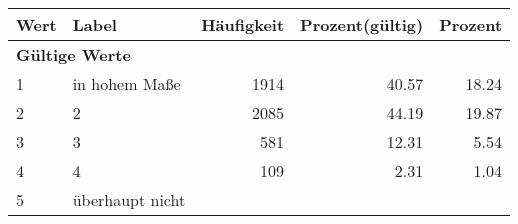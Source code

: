      \begin{longtable}{lXrrr}
     \toprule
     \textbf{Wert} & \textbf{Label} & \textbf{Häufigkeit} & \textbf{Prozent(gültig)} & \textbf{Prozent} \\
     \endhead
     \midrule
     \multicolumn{5}{l}{\textbf{Gültige Werte}}\\

     1 &
     \multicolumn{1}{X}{ in hohem Maße   } &


       \num{1914} &
       \num[round-mode=places,round-precision=2]{40.57} &
         \num[round-mode=places,round-precision=2]{18.24} \\

     2 &
     \multicolumn{1}{X}{ 2   } &


       \num{2085} &
       \num[round-mode=places,round-precision=2]{44.19} &
         \num[round-mode=places,round-precision=2]{19.87} \\

     3 &
     \multicolumn{1}{X}{ 3   } &


       \num{581} &
       \num[round-mode=places,round-precision=2]{12.31} &
         \num[round-mode=places,round-precision=2]{5.54} \\

     4 &
     \multicolumn{1}{X}{ 4   } &


       \num{109} &
       \num[round-mode=places,round-precision=2]{2.31} &
         \num[round-mode=places,round-precision=2]{1.04} \\

     5 &
     \multicolumn{1}{X}{ überhaupt nicht   } &



\end{longtable}
